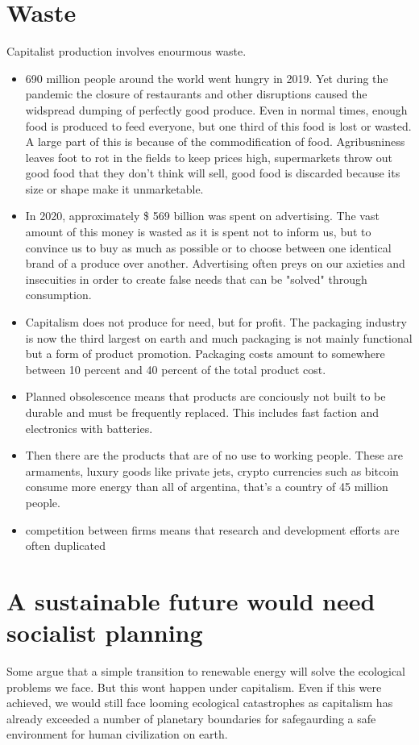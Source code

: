 \documentclass{article}
\begin{document}
\section{Waste}
Capitalist production involves enourmous waste.
\begin{itemize}
	\item 690 million people around the world went hungry in 2019. Yet during the pandemic the closure of restaurants and other disruptions caused the widspread dumping of perfectly good produce. Even in normal times, enough food is produced to feed everyone, but one third of this food is lost or wasted. A large part of this is because of the commodification of food. Agribusniness leaves foot to rot in the fields to keep prices high, supermarkets throw out good food that they don't think will sell, good food is discarded because its size or shape make it unmarketable.
	\item In 2020, approximately \$ 569 billion was spent on advertising. The vast amount of this money is wasted as it is spent not to inform us, but to convince us to buy as much as possible or to choose between one identical brand of a produce over another. Advertising often preys on our axieties and insecuities in order to create false needs that can be "solved" through consumption.
	\item Capitalism does not produce for need, but for profit. The packaging industry is now the third largest on earth and much packaging is not mainly functional but a form of product promotion. Packaging costs amount to somewhere between 10 percent and 40 percent of the total product cost.
	\item Planned obsolescence means that products are conciously not built to be durable and must be frequently replaced. This includes fast faction and electronics with batteries. 
	\item Then there are the products that are of no use to working people. These are armaments, luxury goods like private jets, crypto currencies such as bitcoin consume more energy than all of argentina, that's a country of 45 million people.
	\item competition between firms means that research and development efforts are often duplicated
\end{itemize}

\section{A sustainable future would need socialist planning}
Some argue that a simple transition to renewable energy will solve the ecological problems we face. But this wont happen under capitalism. Even if this were achieved, we would still face looming ecological catastrophes as capitalism has already exceeded a number of planetary boundaries for safegaurding a safe environment for human civilization on earth.
\end{document}
